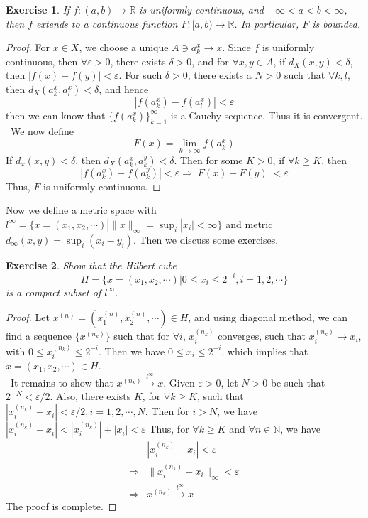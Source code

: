 \documentclass[12pt,leqno]{amsart}
\newtheorem{exercise}{Exercise}[section]
\theoremstyle{definition}
\numberwithin{equation}{subsection}
\begin{document}
\begin{exercise}
If $f:(a,b)\to\mathbb{R}$ is uniformly continuous, and $-\infty < a < b < \infty$, then $f$ extends to a continuous function $F:[a,b)\to\mathbb{R}$. In particular, $F$ is bounded.
\end{exercise}

\begin{proof}
For $x\in X$, we choose a unique $A\ni a_k^x\to x$. Since $f$ is uniformly continuous, then $\forall\varepsilon > 0$, there exists $\delta > 0$, and for $\forall x,y\in A$, if $d_X(x,y) < \delta$, then $|f(x) - f(y)| < \varepsilon$. For such $\delta > 0$, there exists a $N > 0$ such that $\forall k,l$, then $d_X(a_k^x, a_l^x) < \delta$, and hence $$|f(a_k^x) - f(a_l^x)| < \varepsilon$$
then we can know that $\{f(a_k^x)\}^\infty_{k=1}$ is a Cauchy sequence. Thus it is convergent. \\
\hspace*{1em}\, We now define $$F(x) = \lim_{k\to\infty}f(a_k^x)$$
If $d_x(x,y) < \delta$, then $d_X(a_k^x,a_k^y) < \delta$. Then for some $K > 0$, if $\forall k \geq K$, then $$|f(a_k^x) - f(a_k^y)| < \varepsilon \Rightarrow |F(x) - F(y)| < \varepsilon$$
Thus, $F$ is uniformly continuous.
\end{proof}

\medskip

Now we define a metric space with $l^\infty = \{x = (x_1,x_2,\cdots) | \|x\|_\infty = \sup_i |x_i| < \infty\}$ and metric $d_\infty(x,y) = \sup_i (x_i - y_i)$. Then we discuss some exercises. 

\begin{exercise}
Show that the Hilbert cube 
$$H = \{x = (x_1,x_2,\cdots) | 0\leq x_i \leq 2^{-i}, i = 1,2,\cdots\}$$
is a compact subset of $l^\infty$.
\end{exercise}
\begin{proof}
Let $x^{(n)} = \left(x_1^{(n)},x_2^{(n)},\cdots \right)\in H$, and using diagonal method, we can find a sequence $\{x^{(n_k)}\}$ such that for $\forall i$, $x_i^{(n_k)}$ converges, such that $x_i^{(n_k)}\to x_i$, with $0\leq x_i^{(n_k)}\leq 2^{-i}$. Then we have $0\leq x_i\leq 2^{-i}$, which implies that $x = \left(x_1, x_2, \cdots \right)\in H$. \\
\hspace*{1em}\, It remains to show that $x^{(n_k)}\stackrel{l^\infty}{\longrightarrow}x$. Given $\varepsilon > 0$, let $N > 0$ be such that $2^{-N} < \varepsilon/2$. Also, there exists $K$, for $\forall k \geq K$, such that $\left|x_i^{(n_k)} - x_i\right| < \varepsilon/2, i = 1,2,\cdots, N$. Then for $i > N$, we have 
$\left|x_i^{(n_k)} - x_i\right| < \left|x_i^{(n_k)}\right| + |x_i| < \varepsilon$
Thus, for $\forall k \geq K$ and $\forall n\in \mathbb{N}$, we have 
\begin{align*}
    & \left|x_i^{(n_k)} - x_i\right| < \varepsilon \\
    \Rightarrow & \|x_i^{(n_k)} - x_i\|_\infty < \varepsilon \\
    \Rightarrow & x^{(n_k)}\stackrel{l^\infty}{\longrightarrow}x
\end{align*}
The proof is complete.
\end{proof}
\end{document}
